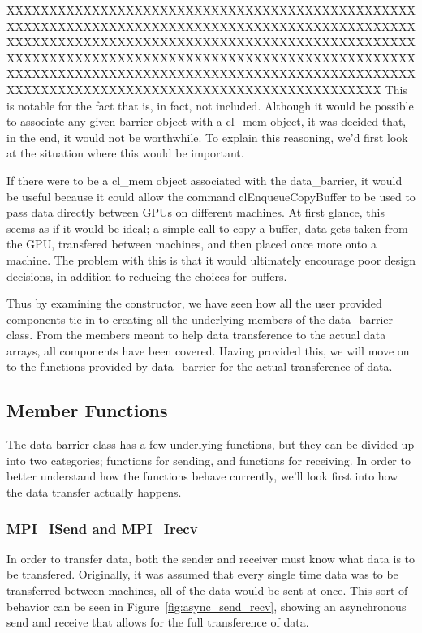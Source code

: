 \documentclass[../thesis.tex]{subfiles}
\begin{document}
  XXXXXXXXXXXXXXXXXXXXXXXXXXXXXXXXXXXXXXXXXXXXXXXXXXXXXXXXXXXXXXXXXXXXXXXXXXXXXXXXXXXXXXXXXXXXXXXXXXXXXXXXXXXXXXXXXXXXXXXXXXXXXXXXXXXXXXXXXXXXXXXXXXXXXXXXXXXXXXXXXXXXXXXXXXXXXXXXXXXXXXXXXXXXXXXXXXXXXXXXXXXXXXXXXXXXXXXXXXXXXXXXXXXXXXXXXXXXXXXXXXXXXXXXXXXXXXXXXXXXXXXXXXXXXXXXXXXXXXXXXXXX
    This is notable for the fact that is, in fact, not included. Although it would be possible to associate any given barrier object with a cl\_mem object, it was decided that, in the end, it would not be worthwhile. To explain this reasoning, we'd first look at the situation where this would be important.

    If there were to be a cl\_mem object associated with the data\_barrier, it would be useful because it could allow the command clEnqueueCopyBuffer to be used to pass data directly between GPUs on different machines. At first glance, this seems as if it would be ideal; a simple call to copy a buffer, data gets taken from the GPU, transfered between machines, and then placed once more onto a machine. The problem with this is that it would ultimately encourage poor design decisions, in addition to reducing the choices for buffers. 

  Thus by examining the constructor, we have seen how all the user provided components tie in to creating all the underlying members of the data\_barrier class. From the members meant to help data transference to the actual data arrays, all components have been covered. Having provided this, we will move on to the functions provided by data\_barrier for the actual transference of data.

\subsection{Member Functions} %
\label{sub:member_functions}
  The data barrier class has a few underlying functions, but they can be divided up into two categories; functions for sending, and functions for receiving. In order to better understand how the functions behave currently, we'll look first into how the data transfer actually happens.

  \subsubsection{MPI\_ISend and MPI\_Irecv} %
  \label{ssub:mpisend_and_mpi_recv}
    In order to transfer data, both the sender and receiver must know what data is to be transfered. Originally, it was assumed that every single time data was to be transferred between machines, all of the data would be sent at once. This sort of behavior can be seen in Figure~\ref{fig:async_send_recv}, showing an asynchronous send and receive that allows for the full transference of data.
\end{document}
